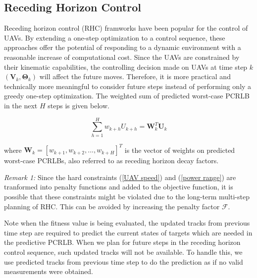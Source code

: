 \documentclass[12pt,journal,draftclsnofoot,onecolumn]{IEEEtran}
\begin{document}



\subsection{Receding Horizon Control}
Receding horizon control (RHC) framworks have been popular for the control of UAVs. By extending a one-step optimization to a control sequence, these approaches offer the potential of responding to a dynamic environment\cite{frew2005receding} with a reasonable increase of computational cost.
Since the UAVs are constrained by their kinematic capabilities, the controlling decision made on UAVs at time step $k$ $(\mathbf{V}_k,\mathbf{\Theta}_k)$ will affect the future moves. Therefore, it is more practical and technically more meaningful to consider future steps instead of performing only a greedy one-step optimization.
The weighted sum of predicted worst-case PCRLB in the next $H$ steps is given below.

\begin{equation}
	\sum_{h=1}^{H}w_{k+h}U_{k+h}=\mathbf{W}_k^T\mathbf{U}_k
\end{equation}

where $\mathbf{W}_k=[w_{k+1}, w_{k+2},...,w_{k+H}]^T$ is the vector of weights on predicted worst-case PCRLBs, also referred to as receding horizon decay factors.

\emph{Remark 1:} Since the hard constraints (\ref{UAV speed}) and (\ref{power range}) are tranformed into penalty functions and added to the objective function, it is possible that these constraints might be violated due to the long-term multi-step planning of RHC. This can be avoided by increasing the penalty factor $\mathcal{F}$.

Note when the fitness value is being evaluated, the updated tracks from previous time step are required to predict the current states of targets which are needed in the predictive PCRLB. When we plan for future steps in the receding horizon control sequence, such updated tracks will not be available. To handle this, we use predicted tracks from previous time step to do the prediction as if no valid measurements were obtained.
\end{document}

